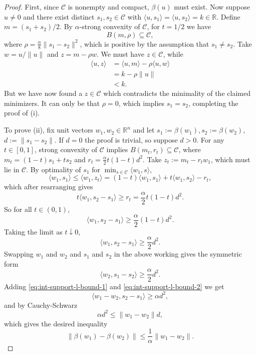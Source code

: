 \documentclass[10pt,a4paper]{amsart}
\newcommand\C{\mathcal{C}}
\begin{document}
\begin{proof}
  First, since $\C$ is nonempty and compact, $\beta(u)$ must exist. Now suppose $u \neq 0$ and there exist distinct $s_1,s_2 \in \C$ with
  $\langle{u,s_1}\rangle = \langle{u,s_2}\rangle = k \in \mathbb{R}$. Define $m = (s_1 + s_2)/2$. By $\alpha$-strong convexity of $\C$, for $t=1/2$ we have
  \[
    B(m,\rho) \subseteq \C,
  \]
  where $\rho = \frac{\alpha}{8}\lVert s_1 - s_2\rVert^2$, which is positive by the assumption that $s_1 \neq s_2$. Take $w = u/\lVert u\rVert$ and
  $z = m - \rho w$. We must have $z \in \C$, while
  \begin{align*}
    \langle{u,z}\rangle &= \langle{u,m}\rangle - \rho\langle{u,w}\rangle\\
                        &= k - \rho\lVert u\rVert\\
                        &< k.
  \end{align*}
  But we have now found a $z\in \C$ which contradicts the minimality of the claimed minimizers. It can only be that $\rho = 0$, which implies $s_1 = s_2$, completing the proof of (i).

  To prove (ii), fix unit vectors $w_1, w_2 \in \mathbb{R}^n$ and let $s_1 := \beta(w_1), s_2 := \beta(w_2)$, $d := \lVert s_1 - s_2\rVert$.
  If $d = 0$ the proof is trivial, so suppose $d > 0$.
  For any $t \in [0,1]$, strong convexity of $\C$ implies $B(m_t, r_t) \subseteq \C$, where
  $m_t = (1-t)s_1 + ts_2$ and $r_t = \frac{\alpha}{2}t(1-t)d^2$. Take $z_t := m_t - r_t w_1$, which must lie in $\C$.
  By optimality of $s_1$ for $\min_{s\in \C}\langle{w_1,s}\rangle$,
  \[
    \langle{w_1,s_1}\rangle \leq \langle{w_1, z_t}\rangle = (1-t)\langle{w_1,s_1}\rangle + t\langle{w_1,s_2}\rangle - r_t,
  \]
  which after rearranging gives
  \[
    t\langle{w_1, s_2 - s_1}\rangle \geq r_t = \frac{\alpha}{2}t(1-t)d^2.
  \]
  So for all $t \in (0,1)$,
  \[
    \langle{w_1,s_2 - s_1}\rangle \geq \frac{\alpha}{2}(1-t)d^2.
  \]
  Taking the limit as $t \downarrow 0$, 
  \begin{equation} \label{eq:int-support-l-bound-1}
    \langle{w_1,s_2 - s_1}\rangle \geq \frac{\alpha}{2}d^2.
  \end{equation}
  Swapping $w_1$ and $w_2$ and $s_1$ and $s_2$ in the above working gives the symmetric form
  \begin{equation} \label{eq:int-support-l-bound-2}
    \langle{w_2,s_1 - s_2}\rangle \geq \frac{\alpha}{2}d^2.
  \end{equation}
  Adding \eqref{eq:int-support-l-bound-1} and \eqref{eq:int-support-l-bound-2} we get
  \[
    \langle{w_1 - w_2, s_2 - s_1}\rangle \geq \alpha d^2,
  \]
  and by Cauchy-Schwarz
  \[
    \alpha d^2 \leq \lVert w_1 - w_2\rVert d,
  \]
  which gives the desired inequality
  \[
    \lVert \beta(w_1) - \beta(w_2)\rVert \leq \frac{1}{\alpha}\lVert w_1 - w_2\rVert.
  \]
\end{proof}
\end{document}
